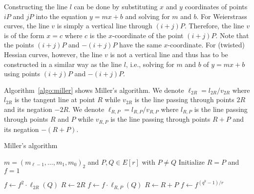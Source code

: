 Constructing the line $l$ can be done by substituting $x$ and $y$ coordinates of points $iP$ and $jP$
into the equation $y = mx + b$ and solving for $m$ and $b$.
For Weierstrass curves, the line $v$ is simply a vertical line through $(i+j)P$.
Therefore, the line $v$ is of the form $x = c$ where $c$ is the $x$-coordinate of the point $(i+j)P$.
Note that the points $(i+j)P$ and $-(i+j)P$ have the same $x$-coordinate.
For (twisted) Hessian curves, however, the line $v$ is not a vertical line
and thus has to be constructed in a similar way as the line $l$,
i.e., solving for $m$ and $b$ of $y = mx + b$ using points $(i+j)P$ and $-(i+j)P$.

Algorithm~\ref{algo:miller} shows Miller's algorithm.
We denote $\ell_{2R} = l_{2R} / v_{2R}$ where $l_{2R}$ is the tangent line at point $R$
while $v_{2R}$ is the line passing through points $2R$ and its negation $-2R$.
We denote $\ell_{R,P} = l_{R,P} / v_{R,P}$ where $l_{R,P}$ is the line passing through points $R$ and $P$
while $v_{R,P}$ is the line passing through points $R+P$ and its negation $-(R+P)$.

\begin{algorithm}
\caption{Miller's algorithm}
\label{algo:miller}
\begin{algorithmic}[1]

	\Require $m = (m_{\ell-1}, \dots, m_1, m_0)_2$ and $P,Q \in E[r]$ with $P \ne Q$
	\State Initialize $R = P$ and $f = 1$

		\State $f \leftarrow f^2 \cdot \ell_{2R}(Q)$
		\State $R \leftarrow 2R$
			\State $f \leftarrow f \cdot \ell_{R,P}(Q)$
			\State $R \leftarrow R+P$
		\EndIf
	\EndFor
	\State $f \leftarrow f^{(q^k-1)/r}$

\end{algorithmic}
\end{algorithm}

